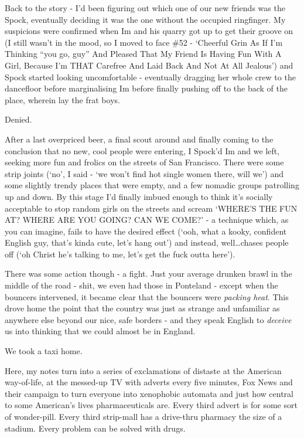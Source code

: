 \documentclass[a5paper,10pt,titlepage,draft]{book}
\begin{document}
Back to the story - I'd been figuring out which one of our new friends was the Spock, eventually deciding it was the one without the occupied ringfinger.  My suspicions were confirmed when Im and his quarry got up to get their groove on (I still wasn't in the mood, so I moved to face \#52 - `Cheerful Grin As If I'm Thinking ``you go, guy'' And Pleased That My Friend Is Having Fun With A Girl, Because I'm THAT Carefree And Laid Back And Not At All Jealous') and Spock started looking uncomfortable - eventually dragging her whole crew to the dancefloor before marginalising Im before finally pushing off to the back of the place, wherein lay the frat boys.

Denied.

After a last overpriced beer, a final scout around and finally coming to the conclusion that no new, cool people were entering, I Spock'd Im and we left, seeking more fun and frolics on the streets of San Francisco.  There were some strip joints (`no', I said - `we won't find hot single women there, will we') and some slightly trendy places that were empty, and a few nomadic groups patrolling up and down.  By this stage I'd finally imbued enough to think it's socially acceptable to stop random girls on the streets and scream `WHERE'S THE FUN AT?  WHERE ARE YOU GOING?  CAN WE COME?' - a technique which, as you can imagine, fails to have the desired effect (`ooh, what a kooky, confident English guy, that's kinda cute, let's hang out') and instead, well\ldots chases people off (`oh Christ he's talking to me, let's get the fuck outta here').

There was some action though - a fight.  Just your average drunken brawl in the middle of the road - shit, we even had those in Ponteland - except when the bouncers intervened, it became clear that the bouncers were \emph{packing heat}.  This drove home the point that the country was just as strange and unfamiliar as anywhere else beyond our nice, safe borders - and they speak English to \emph{deceive} us into thinking that we could almost be in England.

We took a taxi home.

Here, my notes turn into a series of exclamations of distaste at the American way-of-life, at the messed-up TV with adverts every five minutes, Fox News and their campaign to turn everyone into xenophobic automata and just how central to some American's lives pharmaceuticals are.  Every third advert is for some sort of wonder-pill.  Every third strip-mall has a drive-thru pharmacy the size of a stadium.  Every problem can be solved with drugs.
\end{document}
